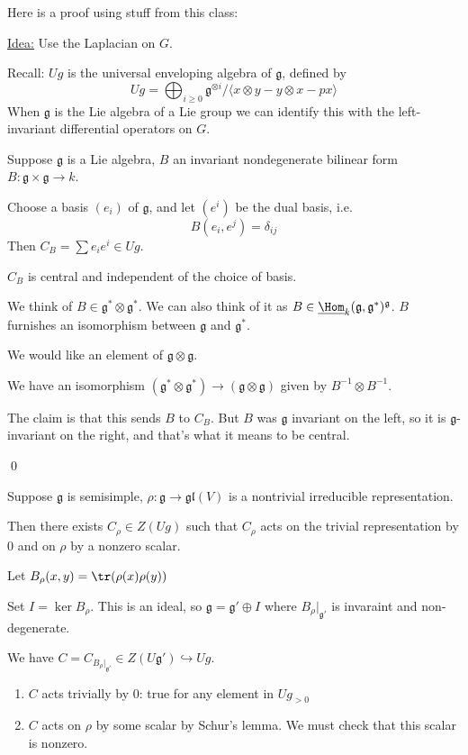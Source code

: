 \documentclass[x11names,reqno,14pt]{extarticle}
\newcommand{\mk}[1]{\mathfrak{#1}}
\newcommand{\g}{\mk{g}}
\newcommand{\into}{\hookrightarrow}
\newcommand{\gl}{\mk{g}\mk{l}}
\begin{document}
Here is a proof using stuff from this class: 

\underline{Idea:} Use the Laplacian on $G$. 

Recall: $Ug$ is the universal enveloping algebra of $\g$, defined by 
\[
Ug = \bigoplus_{i\geq0}\g^{\otimes i}/\langle x\otimes y - y\otimes x - px\rangle
\]
When $\g$ is the Lie algebra of a Lie group we can identify this with the left-invariant differential operators on $G$. 


Suppose $\g$ is a Lie algebra, $B$ an invariant nondegenerate bilinear form $B:\g\times\g\to k$. 

Choose a basis $(e_i)$ of $\g$, and let $(e^i)$ be the dual basis, i.e. 
\[
B(e_i,e^j) = \delta_{ij}
\]
Then $C_B = \sum e_ie^i \in Ug$. 

\prop

$C_B$ is central and independent of the choice of basis. 

\proof

We think of $B \in \g^*\otimes \g^*$. We can also think of it as $B \in \underline{\Hom}_k(\g,\g^*)^\g$. $B$ furnishes an isomorphism between $\g$ and $\g^*$. 

We would like an element of $\g\otimes\g$. 

We have an isomorphism $(\g^*\otimes\g^*) \to (\g\otimes\g)$ given by $B^{-1}\otimes B^{-1}$. 

The claim is that this sends $B$ to $C_B$. But $B$ was $\g$ invariant on the left, so it is $\g$-invariant on the right, and that's what it means to be central. 

\qed

\prop

Suppose $\g$ is semisimple, $\rho:\g\to\gl(V)$ is a nontrivial irreducible representation. 

Then there exists $C_\rho \in Z(Ug)$ such that $C_\rho$ acts on the trivial representation by $0$ and on $\rho$ by a nonzero scalar. 

\proof

Let $B_\rho(x,y) = \tr(\rho(x)\rho(y))$ 

Set $I = \ker B_\rho$. This is an ideal, so $\g = \g'\oplus I$ where $B_\rho|_{\g'}$ is invaraint and non-degenerate.

We have $C = C_{B_\rho|_{\g'}}\in Z(U\g') \into Ug$. 

\begin{enumerate}

\item $C$ acts trivially by 0: true for any element in $Ug_{>0}$

\item $C$ acts on $\rho$ by some scalar by Schur's lemma. We must check that this scalar is nonzero. 

\end{enumerate}
\end{document}
